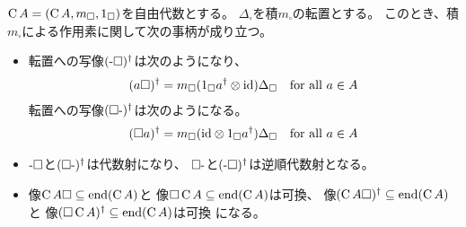 	\begin{proposition}[積による作用素の性質]\label{prop:積による作用素の性質} %
		$\operatorname{C}A=(\operatorname{C}A,m_\square,1_\square)$を自由代数とする。
		$\Delta_\square$を積$m_\square$の転置とする。
		このとき、積$m_\square$による作用素に関して次の事柄が成り立つ。
		\begin{itemize}\setlength{\itemsep}{-1mm} %
			\item 転置への写像$(\myhere\square)^\dag$は次のようになり、
			\begin{equation*}\begin{split} %
				(a\square)^\dag 
				= m_\square(1_\square a^\dag\otimes \myid)\Delta_\square
				\quad\text{for all }a\in A
			\end{split}\end{equation*} %
			転置への写像$(\square\myhere)^\dag$は次のようになる。
			\begin{equation*}\begin{split} %
				(\square a)^\dag 
				= m_\square(\myid\otimes 1_\square a^\dag)\Delta_\square
				\quad\text{for all }a\in A
			\end{split}\end{equation*} %
			\item $\myhere\square$と$(\square\myhere)^\dag$は代数射になり、
			$\square\myhere$と$(\myhere\square)^\dag$は逆順代数射となる。
			\item 像$\operatorname{C}A\square\subseteq\operatorname{end}(\operatorname{C}A)$と
			像$\square\operatorname{C}A\subseteq\operatorname{end}(\operatorname{C}A)$は可換、
			像$(\operatorname{C}A\square)^\dag\subseteq\operatorname{end}(\operatorname{C}A)$と
			像$(\square\operatorname{C}A)^\dag\subseteq\operatorname{end}(\operatorname{C}A)$は可換
			になる。
		\end{itemize} %
	\end{proposition} %

